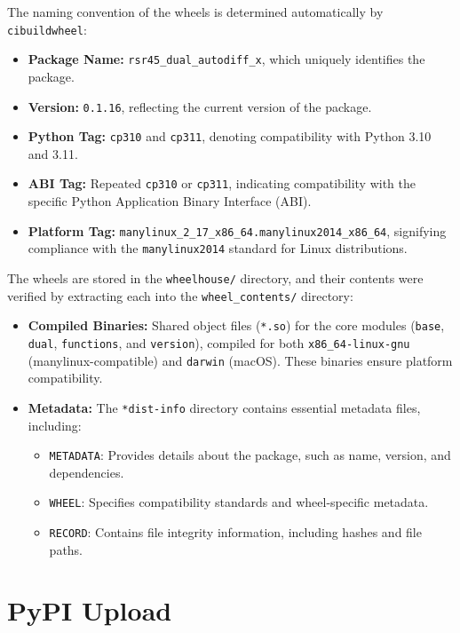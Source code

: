 \documentclass[a4paper,12pt]{article}
\begin{document}
The naming convention of the wheels is determined automatically by \texttt{cibuildwheel}:
\begin{itemize}
    \item \textbf{Package Name:} \texttt{rsr45\_dual\_autodiff\_x}, which uniquely identifies the package.
    \item \textbf{Version:} \texttt{0.1.16}, reflecting the current version of the package.
    \item \textbf{Python Tag:} \texttt{cp310} and \texttt{cp311}, denoting compatibility with Python 3.10 and 3.11.
    \item \textbf{ABI Tag:} Repeated \texttt{cp310} or \texttt{cp311}, indicating compatibility with the specific Python Application Binary Interface (ABI).
    \item \textbf{Platform Tag:} \texttt{manylinux\_2\_17\_x86\_64.manylinux2014\_x86\_64}, signifying compliance with the \texttt{manylinux2014} standard for Linux distributions.
\end{itemize}



The wheels are stored in the \texttt{wheelhouse/} directory, and their contents were verified by extracting each into the \texttt{wheel\_contents/} directory:
\begin{itemize}
    \item \textbf{Compiled Binaries:} Shared object files (\texttt{*.so}) for the core modules (\texttt{base}, \texttt{dual}, \texttt{functions}, and \texttt{version}), compiled for both \texttt{x86\_64-linux-gnu} (manylinux-compatible) and \texttt{darwin} (macOS). These binaries ensure platform compatibility.
    \item \textbf{Metadata:} The \texttt{*dist-info} directory contains essential metadata files, including:
    \begin{itemize}
        \item \texttt{METADATA}: Provides details about the package, such as name, version, and dependencies.
        \item \texttt{WHEEL}: Specifies compatibility standards and wheel-specific metadata.
        \item \texttt{RECORD}: Contains file integrity information, including hashes and file paths.
    \end{itemize}
\end{itemize}



\section*{PyPI Upload}
\end{document}
